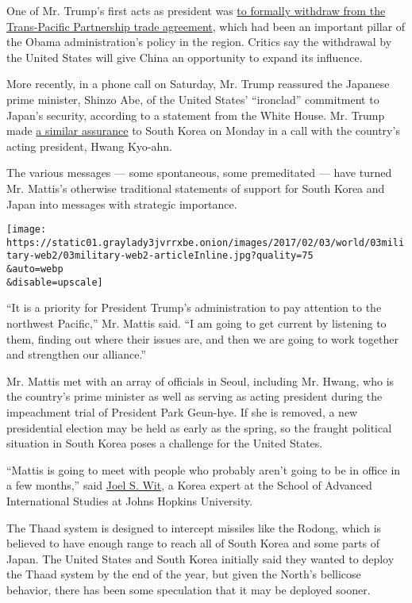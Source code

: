 One of Mr. Trump's first acts as president was
\href{https://www.nytimes3xbfgragh.onion/2017/01/23/us/politics/tpp-trump-trade-nafta.html}{to
formally withdraw from the Trans-Pacific Partnership trade agreement},
which had been an important pillar of the Obama administration's policy
in the region. Critics say the withdrawal by the United States will give
China an opportunity to expand its influence.

More recently, in a phone call on Saturday, Mr. Trump reassured the
Japanese prime minister, Shinzo Abe, of the United States' ``ironclad''
commitment to Japan's security, according to a statement from the White
House. Mr. Trump made
\href{https://www.nytimes3xbfgragh.onion/2017/01/30/world/asia/trump-north-korea-south.html}{a
similar assurance} to South Korea on Monday in a call with the country's
acting president, Hwang Kyo-ahn.

The various messages --- some spontaneous, some premeditated --- have
turned Mr. Mattis's otherwise traditional statements of support for
South Korea and Japan into messages with strategic importance.

\texttt{[image: https://static01.graylady3jvrrxbe.onion/images/2017/02/03/world/03military-web2/03military-web2-articleInline.jpg?quality=75\\\&auto=webp\\\&disable=upscale]}

``It is a priority for President Trump's administration to pay attention
to the northwest Pacific,'' Mr. Mattis said. ``I am going to get current
by listening to them, finding out where their issues are, and then we
are going to work together and strengthen our alliance.''

Mr. Mattis met with an array of officials in Seoul, including Mr. Hwang,
who is the country's prime minister as well as serving as acting
president during the impeachment trial of President Park Geun-hye. If
she is removed, a new presidential election may be held as early as the
spring, so the fraught political situation in South Korea poses a
challenge for the United States.

``Mattis is going to meet with people who probably aren't going to be in
office in a few months,'' said
\href{http://uskoreainstitute.org/research/visiting-scholars/joel-wit/}{Joel
S. Wit}, a Korea expert at the School of Advanced International Studies
at Johns Hopkins University.

The Thaad system is designed to intercept missiles like the Rodong,
which is believed to have enough range to reach all of South Korea and
some parts of Japan. The United States and South Korea initially said
they wanted to deploy the Thaad system by the end of the year, but given
the North's bellicose behavior, there has been some speculation that it
may be deployed sooner.

